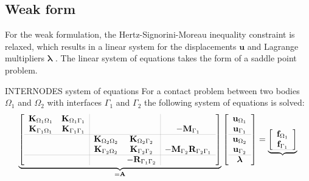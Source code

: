 \documentclass[11pt, a4paper]{article}
\begin{document}
\subsection{Weak form}
\label{subsec:weak}

For the weak formulation, the Hertz-Signorini-Moreau inequality constraint is relaxed, which results in a linear system for the displacements $\mathbf{u}$ and Lagrange multipliers $\boldsymbol{\lambda}$ \cite{voet}. The linear system of equations takes the form of a saddle point problem.

\begin{block}{INTERNODES system of equations}
For a contact problem between two bodies $\Omega_1$ and $\Omega_2$ with interfaces $\Gamma_1$ and $\Gamma_2$ the following system of equations is solved:
\begin{equation}
\underbrace{
\begin{bmatrix}
\setlength\arrayrulewidth{.1pt}
\begin{array}{cc|cc|c}
    \mathbf{K}_{\Omega_1\Omega_1} & \mathbf{K}_{\Omega_1\Gamma_1} & & &  \\
    \mathbf{K}_{\Gamma_1\Omega_1} & \mathbf{K}_{\Gamma_1\Gamma_1} & &  & - \mathbf{M}_{\Gamma_1} \\ \hline
     & & \mathbf{K}_{\Omega_2\Omega_2} & \mathbf{K}_{\Omega_2\Gamma_2} &  \\
     & & \mathbf{K}_{\Gamma_2\Omega_2} & \mathbf{K}_{\Gamma_2\Gamma_2} & -\mathbf{M}_{\Gamma_2} \mathbf{R}_{\Gamma_2 \Gamma_1} \\ \hline
     & & & -\mathbf{R}_{\Gamma_1 \Gamma_2} & 
\end{array}
\end{bmatrix}
}_{= \mathbf{A}}
\begin{bmatrix}
\setlength\arrayrulewidth{.1pt}
\begin{array}{c}
    \mathbf{u}_{\Omega_1} \\
    \mathbf{u}_{\Gamma_1} \\ \hline
    \mathbf{u}_{\Omega_2} \\
    \mathbf{u}_{\Gamma_2} \\ \hline
    \boldsymbol{\lambda} \\
\end{array}
\end{bmatrix}
=
\underbrace{
\begin{bmatrix}
\setlength\arrayrulewidth{.1pt}
\begin{array}{c}
    \mathbf{f}_{\Omega_1} \\
    \mathbf{f}_{\Gamma_1} \\ \hline

\end{array}
\end{bmatrix}}
\end{equation}
\end{block}
\end{document}
